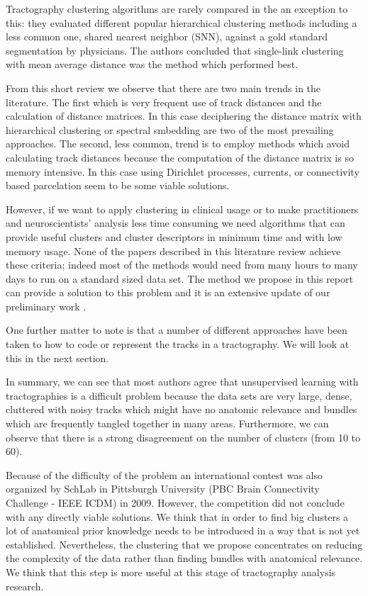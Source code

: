 \documentclass[preprint,authoryear,a4paper,10pt,onecolumn]{elsarticle}
\begin{document}
Tractography clustering algorithms are rarely compared in the
an exception to this: they evaluated different popular hierarchical
clustering methods including a less common one, shared nearest neighbor
(SNN), against a gold standard segmentation by physicians. The authors
concluded that single-link clustering with mean average distance was the
method which performed best. 

From this short review we observe that there are two main trends in the
literature. The first which is very frequent use of track distances and
the calculation of distance matrices. In this case deciphering the
distance matrix with hierarchical clustering or spectral smbedding are
two of the most prevailing approaches. The second, less common, trend is
to employ methods which avoid calculating track distances because the
computation of the distance matrix is so memory intensive. In this case
using Dirichlet processes, currents, or connectivity based parcelation
seem to be some viable solutions. 

However, if we want to apply clustering in clinical usage or to make
practitioners and neuroscientists' analysis less time consuming we need
algorithms that can provide useful clusters and cluster descriptors in
minimum time and with low memory usage. None of the papers described in
this literature review achieve these criteria; indeed most of the
methods would need from many hours to many days to run on a standard
sized data set. The method we propose in this report can provide a
solution to this problem and it is an extensive update of our
preliminary work \citet{EGMB10}.

One further matter to note is that a number of different approaches have
been taken to how to code or represent the tracks in a tractography. We
will look at this in the next section.

In summary, we can see that most authors agree that unsupervised
learning with tractographies is a difficult problem because the data
sets are very large, dense, cluttered with noisy tracks which might have
no anatomic relevance and bundles which are frequently tangled together
in many areas. Furthermore, we can observe that there is a strong
disagreement on the number of clusters (from 10 to 60).

Because of the difficulty of the problem an international contest was
also organized by SchLab in Pittsburgh University (PBC Brain
Connectivity Challenge - IEEE ICDM) in 2009. However, the competition
did not conclude with any directly viable solutions. We think that in order
to find big clusters a lot of anatomical prior knowledge needs to be
introduced in a way that is not yet established. Nevertheless, the
clustering that we propose concentrates on reducing the complexity of
the data rather than finding bundles with anatomical relevance. We think
that this step is more useful at this stage of tractography analysis
research.
\end{document}
